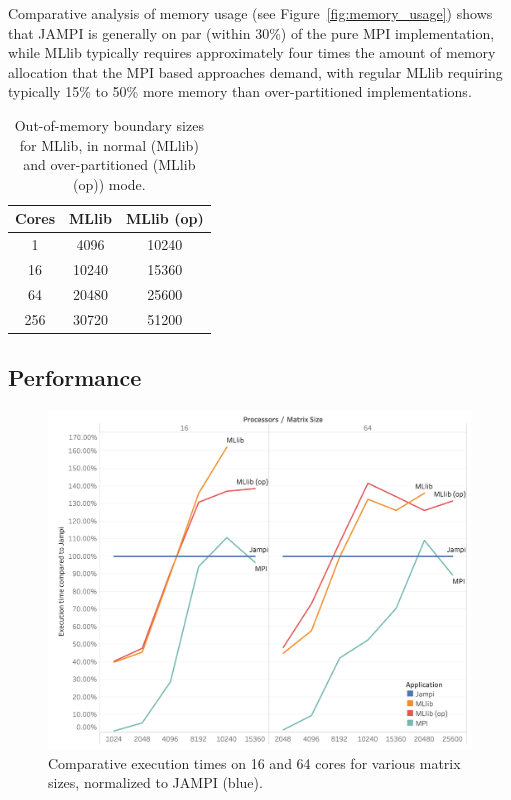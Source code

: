 \documentclass[fleqn,10pt]{SelfArx} %
\begin{document}
Comparative analysis of memory usage (see Figure~\ref{fig:memory_usage}) shows that JAMPI is generally on par (within 30\%) of the pure MPI implementation, while MLlib typically requires approximately four times the amount of memory allocation that the MPI based approaches demand, with regular MLlib requiring typically 15\% to 50\% more memory than over-partitioned implementations.

\begin{table}
	\centering
	\begin{tabular}{ |c|c|c| } 
	 \hline
	 Cores & MLlib & MLlib (op)  \\ 
	 \hline\hline
	 1 & 4096 & 10240 \\ 
	 \hline
	 16 & 10240 & 15360 \\ 
	 \hline
	 64 & 20480 & 25600 \\ 
	 \hline
	 256 & 30720 & 51200 \\ 
	 \hline
	\end{tabular}
	\caption{Out-of-memory boundary sizes for MLlib, in normal (MLlib) and over-partitioned (MLlib (op)) mode.}
	\label{tab:out_of_memory}
\end{table}
	

\subsection{Performance} %
\label{sub:performance}


\begin{figure}
	\centering
	\includegraphics[width=0.9\linewidth]{compared_to_jampi}
	\vspace{14pt}
	\caption{Comparative execution times on 16 and 64 cores for various matrix sizes, normalized to JAMPI (blue).}
	\label{fig:comparison_to_jampi}
\end{figure}
\end{document}
